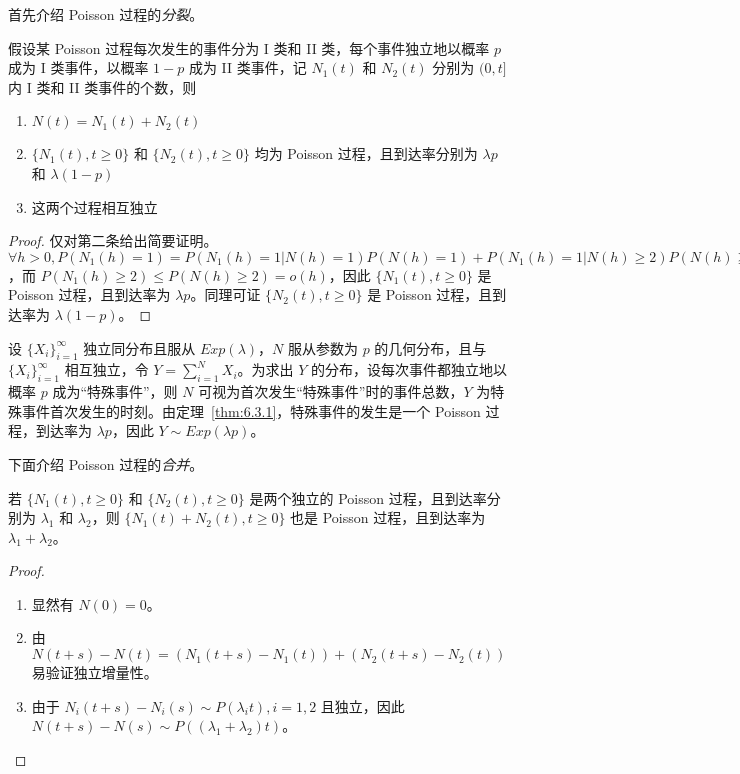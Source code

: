 \documentclass[../main.tex]{subfiles}
\begin{document}
首先介绍 Poisson 过程的\emph{分裂}。

\begin{theorem}\label{thm:6.3.1}
    假设某 Poisson 过程每次发生的事件分为 I 类和 II 类，每个事件独立地以概率 $p$ 成为 I 类事件，以概率 $1-p$ 成为 II 类事件，记 $N_1(t)$ 和 $N_2(t)$ 分别为 $(0,t]$ 内 I 类和 II 类事件的个数，则
    \begin{enumerate}
        \item $N(t)=N_1(t)+N_2(t)$
        \item $\{N_1(t),t\geq0\}$ 和 $\{N_2(t),t\geq0\}$ 均为 Poisson 过程，且到达率分别为 $\lambda p$ 和 $\lambda(1-p)$
        \item 这两个过程相互独立
    \end{enumerate}
\end{theorem}

\begin{proof}
    仅对第二条给出简要证明。$\forall h>0,P(N_1(h)=1)=P(N_1(h)=1|N(h)=1)P(N(h)=1)+P(N_1(h)=1|N(h)\geq2)P(N(h)\geq2)=p(\lambda h+o(h))+o(h)=\lambda ph+o(h)$，而 $P(N_1(h)\geq2)\leq P(N(h)\geq2)=o(h)$，因此 $\{N_1(t),t\geq0\}$ 是 Poisson 过程，且到达率为 $\lambda p$。同理可证 $\{N_2(t),t\geq0\}$ 是 Poisson 过程，且到达率为 $\lambda(1-p)$。
\end{proof}

\begin{example}
    设 $\{X_i\}_{i=1}^\infty$ 独立同分布且服从 $Exp(\lambda)$，$N$ 服从参数为 $p$ 的几何分布，且与 $\{X_i\}_{i=1}^\infty$ 相互独立，令 $Y=\sum_{i=1}^NX_i$。为求出 $Y$ 的分布，设每次事件都独立地以概率 $p$ 成为“特殊事件”，则 $N$ 可视为首次发生“特殊事件”时的事件总数，$Y$ 为特殊事件首次发生的时刻。由定理~\ref{thm:6.3.1}，特殊事件的发生是一个 Poisson 过程，到达率为 $\lambda p$，因此 $Y\sim Exp(\lambda p)$。
\end{example}

下面介绍 Poisson 过程的\emph{合并}。

\begin{theorem}\label{thm:6.3.2}
    若 $\{N_1(t),t\geq0\}$ 和 $\{N_2(t),t\geq0\}$ 是两个独立的 Poisson 过程，且到达率分别为 $\lambda_1$ 和 $\lambda_2$，则 $\{N_1(t)+N_2(t),t\geq0\}$ 也是 Poisson 过程，且到达率为 $\lambda_1+\lambda_2$。
\end{theorem}

\begin{proof}
    \mbox{}
    \begin{enumerate}
        \item 显然有 $N(0)=0$。
        \item 由 $N(t+s)-N(t)=(N_1(t+s)-N_1(t))+(N_2(t+s)-N_2(t))$ 易验证独立增量性。
        \item 由于 $N_i(t+s)-N_i(s)\sim P(\lambda_i t),i=1,2$ 且独立，因此 $N(t+s)-N(s)\sim P((\lambda_1+\lambda_2)t)$。
    \end{enumerate}
\end{proof}
\end{document}
